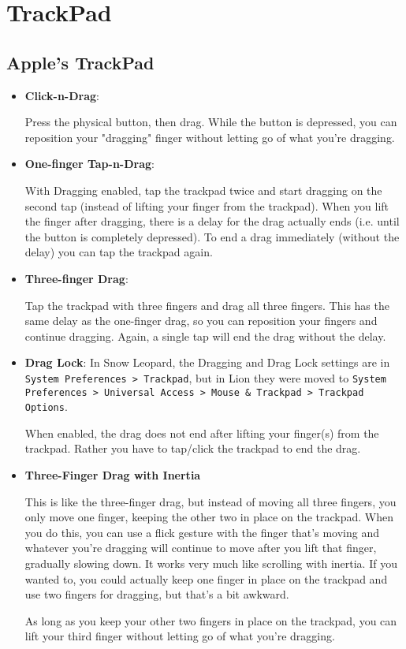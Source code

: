 \section{TrackPad}

\subsection{Apple's TrackPad}

\begin{itemize}
  \item {\bf Click-n-Drag}: 
  
  Press the physical button, then drag. While the button is depressed, you can
  reposition your "dragging" finger without letting go of what you're dragging.
  
  \item {\bf One-finger Tap-n-Drag}:
  
   With Dragging enabled, tap the trackpad twice and start dragging on the
   second tap (instead of lifting your finger from the trackpad).
   When you lift the finger after dragging, there is a delay for the drag
   actually ends (i.e. until the button is completely depressed).
   To end a drag immediately (without the delay) you can tap the trackpad again.
   
   \item {\bf Three-finger Drag}:
   
   Tap the trackpad with three fingers and drag all three fingers. This has the
   same delay as the one-finger drag, so you can reposition your fingers and
   continue dragging. Again, a single tap will end the drag without the delay.
   
   \item {\bf Drag Lock}:
   In Snow Leopard, the Dragging and Drag Lock settings are in 
   \verb!System Preferences > Trackpad!, but in Lion they were moved to 
   \verb!System Preferences > Universal Access > Mouse & Trackpad > Trackpad!
   \verb!Options!.
   
   
   When enabled, the drag does not end after lifting your finger(s) from the
   trackpad. Rather you have to tap/click the trackpad to end the drag.
   
   \item {\bf Three-Finger Drag with Inertia}
   
   This is like the three-finger drag, but instead of moving all three fingers,
   you only move one finger, keeping the other two in place on the trackpad.
   When you do this, you can use a flick gesture with the finger that's moving
   and whatever you're dragging will continue to move after you lift that
   finger, gradually slowing down. It works very much like scrolling with
   inertia.
   If you wanted to, you could actually keep one finger in place on the trackpad
   and use two fingers for dragging, but that's a bit awkward.
   
   As long as you keep your other two fingers in place on the trackpad, you can
   lift your third finger without letting go of what you're dragging.
   
\end{itemize}
